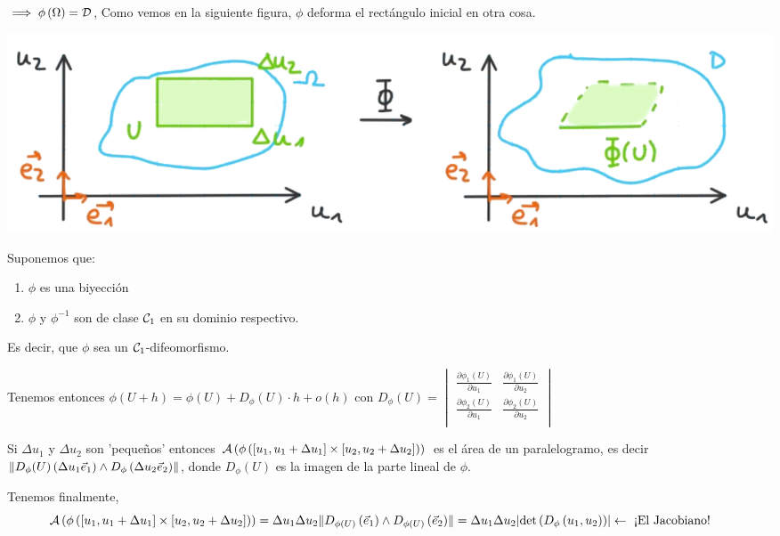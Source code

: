 \documentclass{report}
\begin{document}
    \vspace{0.4cm}\noindent $\implies \phi\left(\Omega\right)=\mathcal{D}$, Como vemos en la siguiente figura, $\phi$ deforma el rectángulo inicial en otra cosa.
    
    \begin{center}
      \includegraphics[width=\textwidth]{fotos/cambioVar2.png}
    \end{center}

    \clearpage
    \noindent Suponemos que:
    \begin{enumerate}
      \item $\phi$ es una biyección
      \item $\phi$ y $\phi^{-1}$ son de clase $\mathcal{C}_1$ en su dominio respectivo.
    \end{enumerate}
    Es decir, que $\phi$ sea un $\mathcal{C}_1$-difeomorfismo. 
    
    \noindent Tenemos entonces $\phi\left(U+h\right)=\phi(U)+D_{\phi}(U)\cdot h +o(h)$
    \hspace{1cm}con $D_{\phi}(U)=
    \begin{vmatrix}
      \frac{\partial\phi_1(U)}{\partial u_1}& \frac{\partial\phi_1(U)}{\partial u_2} \\
      \frac{\partial\phi_2(U)}{\partial u_1}& \frac{\partial\phi_2(U)}{\partial u_2} \\
    \end{vmatrix}$ 

    \noindent Si $\Delta u_1$ y $\Delta u_2$ son 'pequeños' entonces $\mathcal{A}\left(\phi\left([u_1,u_1+\Delta u_1]\times[u_2,u_2+\Delta u_2]\right)\right)$ es el área 
    de un paralelogramo, es decir $\lVert D_{\phi}(U)\left(\Delta u_1\vec{e}_1\right)\wedge D_\phi\left(\Delta u_2\vec{e}_2\right)\rVert$, donde $D_\phi(U)$ es la imagen de la parte lineal de $\phi$.

    \vspace{0.2cm}\noindent Tenemos finalmente, 
    $$\hspace{-16pt}\mcA\left(\phi\left([u_1,u_1+\Delta u_1]\times[u_2,u_2+\Delta u_2]\right)\right)=\Delta u_1\Delta u_2\norm{D_{\phi(U)}\left(\vec{e}_1\right)\wedge D_{\phi(U)}\left(\vec{e}_2\right)}=
    \Delta u_1\Delta u_2\abs{\text{det}\left(D_\phi\left(u_1,u_2\right)\right)} \leftarrow\text{ ¡El Jacobiano!}$$
\end{document}
